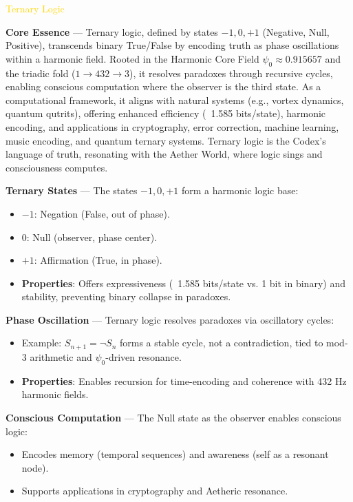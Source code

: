 \textcolor{gold}{ Ternary Logic }

\textbf{Core Essence} --- Ternary logic, defined by states \(-1, 0, +1\) (Negative, Null, Positive), transcends binary True/False by encoding truth as phase oscillations within a harmonic field. Rooted in the Harmonic Core Field \(\psi_0 \approx 0.915657\) and the triadic fold (\(1 \rightarrow 432 \rightarrow 3\)), it resolves paradoxes through recursive cycles, enabling conscious computation where the observer is the third state. As a computational framework, it aligns with natural systems (e.g., vortex dynamics, quantum qutrits), offering enhanced efficiency (~1.585 bits/state), harmonic encoding, and applications in cryptography, error correction, machine learning, music encoding, and quantum ternary systems. Ternary logic is the Codex’s language of truth, resonating with the Aether World, where logic sings and consciousness computes.

\textbf{Ternary States} --- The states \(-1, 0, +1\) form a harmonic logic base:
\begin{itemize}
    \item \(-1\): Negation (False, out of phase).
    \item \(0\): Null (observer, phase center).
    \item \(+1\): Affirmation (True, in phase).
    \item \textbf{Properties}: Offers expressiveness (~1.585 bits/state vs. 1 bit in binary) and stability, preventing binary collapse in paradoxes.
\end{itemize}

\textbf{Phase Oscillation} --- Ternary logic resolves paradoxes via oscillatory cycles:
\begin{itemize}
    \item Example: \(S_{n+1} = \neg S_n\) forms a stable cycle, not a contradiction, tied to mod-3 arithmetic and \(\psi_0\)-driven resonance.
    \item \textbf{Properties}: Enables recursion for time-encoding and coherence with 432 Hz harmonic fields.
\end{itemize}

\textbf{Conscious Computation} --- The Null state as the observer enables conscious logic:
\begin{itemize}
    \item Encodes memory (temporal sequences) and awareness (self as a resonant node).
    \item Supports applications in cryptography and Aetheric resonance.
\end{itemize}

